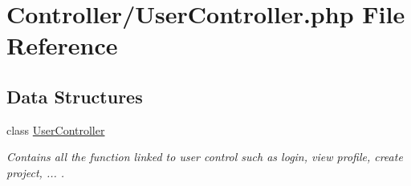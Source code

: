\hypertarget{_user_controller_8php}{}\section{Controller/\+User\+Controller.php File Reference}
\label{_user_controller_8php}
\subsection*{Data Structures}
\begin{DoxyCompactItemize}
\item 
class \hyperlink{class_user_controller}{User\+Controller}
\begin{DoxyCompactList}\small\item\em Contains all the function linked to user control such as login, view profile, create project, ... . \end{DoxyCompactList}\end{DoxyCompactItemize}
